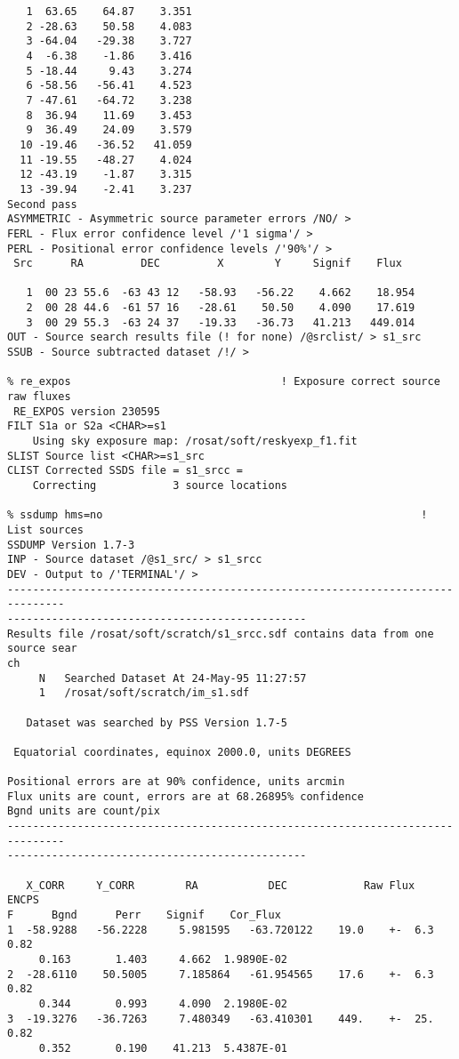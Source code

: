 \begin{small}
\begin{verbatim}
   1  63.65    64.87    3.351
   2 -28.63    50.58    4.083
   3 -64.04   -29.38    3.727
   4  -6.38    -1.86    3.416
   5 -18.44     9.43    3.274
   6 -58.56   -56.41    4.523
   7 -47.61   -64.72    3.238
   8  36.94    11.69    3.453
   9  36.49    24.09    3.579
  10 -19.46   -36.52   41.059
  11 -19.55   -48.27    4.024
  12 -43.19    -1.87    3.315
  13 -39.94    -2.41    3.237
Second pass
ASYMMETRIC - Asymmetric source parameter errors /NO/ > 
FERL - Flux error confidence level /'1 sigma'/ > 
PERL - Positional error confidence levels /'90%'/ > 
 Src      RA         DEC         X        Y     Signif    Flux

   1  00 23 55.6  -63 43 12   -58.93   -56.22    4.662    18.954
   2  00 28 44.6  -61 57 16   -28.61    50.50    4.090    17.619
   3  00 29 55.3  -63 24 37   -19.33   -36.73   41.213   449.014
OUT - Source search results file (! for none) /@srclist/ > s1_src
SSUB - Source subtracted dataset /!/ > 

% re_expos                                 ! Exposure correct source raw fluxes
 RE_EXPOS version 230595
FILT S1a or S2a <CHAR>=s1
    Using sky exposure map: /rosat/soft/reskyexp_f1.fit
SLIST Source list <CHAR>=s1_src
CLIST Corrected SSDS file = s1_srcc =
    Correcting            3 source locations

% ssdump hms=no                                                  ! List sources
SSDUMP Version 1.7-3
INP - Source dataset /@s1_src/ > s1_srcc
DEV - Output to /'TERMINAL'/ > 
-------------------------------------------------------------------------------
-----------------------------------------------
Results file /rosat/soft/scratch/s1_srcc.sdf contains data from one source sear
ch
     N   Searched Dataset At 24-May-95 11:27:57
     1   /rosat/soft/scratch/im_s1.sdf
          
   Dataset was searched by PSS Version 1.7-5

 Equatorial coordinates, equinox 2000.0, units DEGREES

Positional errors are at 90% confidence, units arcmin
Flux units are count, errors are at 68.26895% confidence
Bgnd units are count/pix
-------------------------------------------------------------------------------
-----------------------------------------------

   X_CORR     Y_CORR        RA           DEC            Raw Flux          ENCPS
F      Bgnd      Perr    Signif    Cor_Flux
1  -58.9288   -56.2228     5.981595   -63.720122    19.0    +-  6.3       0.82
     0.163       1.403     4.662  1.9890E-02
2  -28.6110    50.5005     7.185864   -61.954565    17.6    +-  6.3       0.82
     0.344       0.993     4.090  2.1980E-02
3  -19.3276   -36.7263     7.480349   -63.410301    449.    +-  25.       0.82
     0.352       0.190    41.213  5.4387E-01



\end{verbatim}
\end{small}
